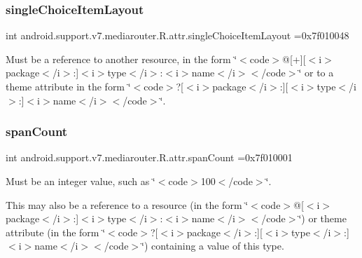 \subsubsection{\texorpdfstring{single\+Choice\+Item\+Layout}{singleChoiceItemLayout}}
{\footnotesize\ttfamily int android.\+support.\+v7.\+mediarouter.\+R.\+attr.\+single\+Choice\+Item\+Layout =0x7f010048\hspace{0.3cm}{\ttfamily [static]}}

Must be a reference to another resource, in the form \char`\"{}$<$code$>$@\mbox{[}+\mbox{]}\mbox{[}$<$i$>$package$<$/i$>$\+:\mbox{]}$<$i$>$type$<$/i$>$\+:$<$i$>$name$<$/i$>$$<$/code$>$\char`\"{} or to a theme attribute in the form \char`\"{}$<$code$>$?\mbox{[}$<$i$>$package$<$/i$>$\+:\mbox{]}\mbox{[}$<$i$>$type$<$/i$>$\+:\mbox{]}$<$i$>$name$<$/i$>$$<$/code$>$\char`\"{}. \mbox{\label{classandroid_1_1support_1_1v7_1_1mediarouter_1_1R_1_1attr_aaacd26dca5bbd7b54e2c2036015d289f}} 
\subsubsection{\texorpdfstring{span\+Count}{spanCount}}
{\footnotesize\ttfamily int android.\+support.\+v7.\+mediarouter.\+R.\+attr.\+span\+Count =0x7f010001\hspace{0.3cm}{\ttfamily [static]}}

Must be an integer value, such as \char`\"{}$<$code$>$100$<$/code$>$\char`\"{}. 

This may also be a reference to a resource (in the form \char`\"{}$<$code$>$@\mbox{[}$<$i$>$package$<$/i$>$\+:\mbox{]}$<$i$>$type$<$/i$>$\+:$<$i$>$name$<$/i$>$$<$/code$>$\char`\"{}) or theme attribute (in the form \char`\"{}$<$code$>$?\mbox{[}$<$i$>$package$<$/i$>$\+:\mbox{]}\mbox{[}$<$i$>$type$<$/i$>$\+:\mbox{]}$<$i$>$name$<$/i$>$$<$/code$>$\char`\"{}) containing a value of this type. \mbox{\label{classandroid_1_1support_1_1v7_1_1mediarouter_1_1R_1_1attr_aa260067bb070619d75ad966a1c005ae3}} 
